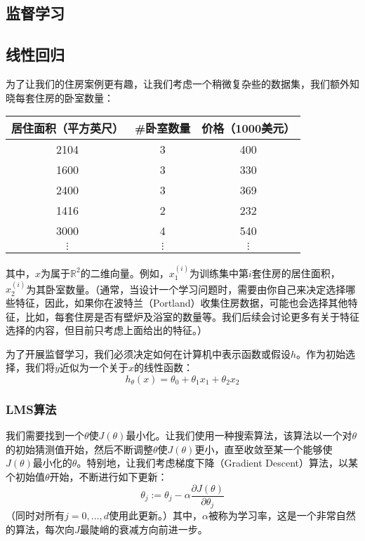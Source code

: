 \documentclass[letterpaper,11pt]{report}
\numberwithin{equation}{section}
\begin{document}
\begin{CJK}{UTF8}{gbsn}
  \part{监督学习}

  \chapter{线性回归}

  为了让我们的住房案例更有趣，让我们考虑一个稍微复杂些的数据集，我们额外知晓每套住房的卧室数量：

  \begin{center}
    \begin{tabular}{c|c|c}
      居住面积（平方英尺） & \#卧室数量 & 价格（1000美元） \\
      \hline
      2104                 & 3          & 400              \\
      1600                 & 3          & 330              \\
      2400                 & 3          & 369              \\
      1416                 & 2          & 232              \\
      3000                 & 4          & 540              \\
      $\vdots$             & $\vdots$   & $\vdots$         \\
    \end{tabular}
  \end{center}

  其中，$x$为属于$\mathbb{R}^2$的二维向量。例如，$x_1^{(i)}$为训练集中第$i$套住房的居住面积，$x_2^{(i)}$为其卧室数量。（通常，当设计一个学习问题时，需要由你自己来决定选择哪些特征，因此，如果你在波特兰（Portland）收集住房数据，可能也会选择其他特征，比如，每套住房是否有壁炉及浴室的数量等。我们后续会讨论更多有关于特征选择的内容，但目前只考虑上面给出的特征。）

  为了开展监督学习，我们必须决定如何在计算机中表示函数或假设$h$。作为初始选择，我们将$y$近似为一个关于$x$的线性函数：
  $$
    h_\theta(x)=\theta_0+\theta_1 x_1 + \theta_2 x_2
  $$

  \section{LMS算法}
  我们需要找到一个$\theta$使$J(\theta)$最小化。让我们使用一种搜索算法，该算法以一个对$\theta$的初始猜测值开始，然后不断调整$\theta$使$J(\theta)$更小，直至收敛至某一个能够使$J(\theta)$最小化的$\theta$。特别地，让我们考虑梯度下降（Gradient Descent）算法，以某个初始值$\theta$开始，不断进行如下更新：
  $$
    \theta_j:=\theta_j-\alpha\frac{\partial J(\theta)}{\partial \theta_j}
  $$
  （同时对所有$j=0,\ldots,d$使用此更新。）其中，$\alpha$被称为学习率，这是一个非常自然的算法，每次向$J$最陡峭的衰减方向前进一步。


\end{CJK}
\end{document}

